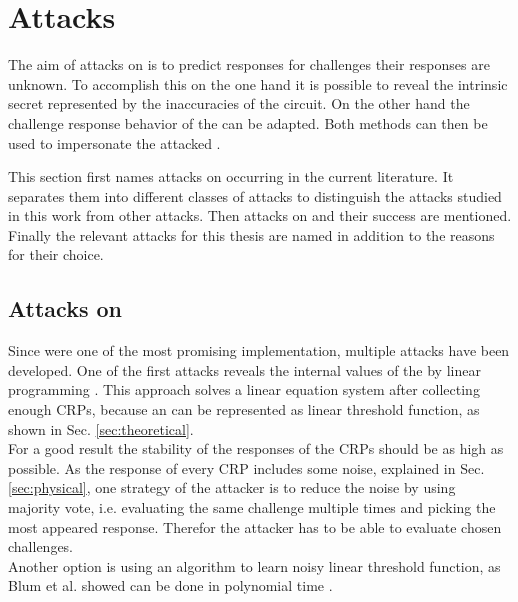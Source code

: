 \chapter{Attacks}
\label{cap:attacks}

The aim of attacks on \apuf is to predict responses for challenges their responses are unknown.
To accomplish this on the one hand it is possible to reveal the intrinsic secret represented by the inaccuracies of the \apuf circuit.
On the other hand the challenge response behavior of the \puf can be adapted.
Both methods can then be used to impersonate the attacked \puf.

This section first names attacks on \apufs occurring in the current literature.
It separates them into different classes of attacks to distinguish the attacks studied in this work from other attacks.
Then attacks on \xpufs and their success are mentioned.
Finally the relevant attacks for this thesis are named in addition to the reasons for their choice.


\section{Attacks on \apufs}
\label{sec:attacksonarbiter}

Since \apufs were one of the most promising \puf implementation, multiple attacks have been developed.
One of the first attacks reveals the internal values of the \apuf by linear programming \cite{Ozturk2008TowardsDevices}.
This approach solves a linear equation system after collecting enough \acp{CRP}, because an \apuf can be represented as linear threshold function, as shown in Sec. \ref{sec:theoretical}.\\
For a good result the stability of the responses of the \acp{CRP} should be as high as possible.
As the response of every \ac{CRP} includes some noise, explained in Sec. \ref{sec:physical}, one strategy of the attacker is to reduce the noise by using majority vote, i.e. evaluating the same challenge multiple times and picking the most appeared response.
Therefor the attacker has to be able to evaluate chosen challenges.\\
Another option is using an algorithm to learn noisy linear threshold function, as Blum et al. showed can be done in polynomial time \cite{Blum1998AlgorithmicaNoisy}.

